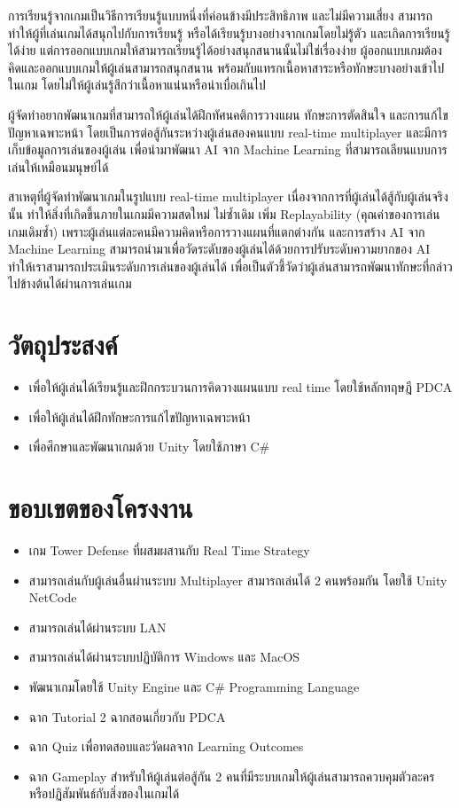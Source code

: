 \documentclass[12pt,oneside,openright,a4paper]{cpe-thai-project}
\begin{document}
การเรียนรู้จากเกมเป็นวิธีการเรียนรู้แบบหนึ่งที่ค่อนข้างมีประสิทธิภาพ และไม่มีความเสี่ยง 
สามารถทำให้ผู้ที่เล่นเกมได้สนุกไปกับการเรียนรู้ หรือได้เรียนรู้บางอย่างจากเกมโดยไม่รู้ตัว 
และเกิดการเรียนรู้ได้ง่าย แต่การออกแบบเกมให้สามารถเรียนรู้ได้อย่างสนุกสนานนั้นไม่ใช่เรื่องง่าย 
ผู้ออกแบบเกมต้องคิดและออกแบบเกมให้ผู้เล่นสามารถสนุกสนาน พร้อมกับแทรกเนื้อหาสาระหรือทักษะบางอย่างเข้าไปในเกม 
โดยไม่ให้ผู้เล่นรู้สึกว่าเนื้อหาแน่นหรือน่าเบื่อเกินไป

ผู้จัดทำอยากพัฒนาเกมที่สามารถให้ผู้เล่นได้ฝึกทัศนคติการวางแผน ทักษะการตัดสินใจ และการแก้ไขปัญหาเฉพาะหน้า 
โดยเป็นการต่อสู้กันระหว่างผู้เล่นสองคนแบบ real-time multiplayer และมีการเก็บข้อมูลการเล่นของผู้เล่น 
เพื่อนำมาพัฒนา AI จาก Machine Learning ที่สามารถเลียนแบบการเล่นให้เหมือนมนุษย์ได้

สาเหตุที่ผู้จัดทำพัฒนาเกมในรูปแบบ real-time multiplayer เนื่องจากการที่ผู้เล่นได้สู้กับผู้เล่นจริงนั้น
ทำให้สิ่งที่เกิดขึ้นภายในเกมมีความสดใหม่ ไม่ซ้ำเดิม เพิ่ม Replayability (คุณค่าของการเล่นเกมเดิมซ้ำ) 
เพราะผู้เล่นแต่ละคนมีความคิดหรือการวางแผนที่แตกต่างกัน และการสร้าง AI จาก Machine Learning 
สามารถนำมาเพื่อวัดระดับของผู้เล่นได้ด้วยการปรับระดับความยากของ AI ทำให้เราสามารถประเมินระดับการเล่นของผู้เล่นได้ 
เพื่อเป็นตัวชี้วัดว่าผู้เล่นสามารถพัฒนาทักษะที่กล่าวไปข้างต้นได้ผ่านการเล่นเกม


\section{วัตถุประสงค์}

\begin{itemize}
\item เพื่อให้ผู้เล่นได้เรียนรู้และฝึกกระบวนการคิดวางแผนแบบ real time โดยใช้หลักทฤษฎี PDCA
\item เพื่อให้ผู้เล่นได้ฝึกทักษะการแก้ไขปัญหาเฉพาะหน้า
\item เพื่อศึกษาและพัฒนาเกมด้วย Unity โดยใช้ภาษา C\#
\end{itemize}


\section{ขอบเขตของโครงงาน}

\begin{itemize}
\item  เกม Tower Defense ที่ผสมผสานกับ Real Time Strategy
\item  สามารถเล่นกับผู้เล่นอื่นผ่านระบบ Multiplayer สามารถเล่นได้ 2 คนพร้อมกัน โดยใช้ Unity NetCode
\item  สามารถเล่นได้ผ่านระบบ LAN
\item  สามารถเล่นได้ผ่านระบบปฏิบัติการ Windows และ MacOS
\item  พัฒนาเกมโดยใช้ Unity Engine และ C\# Programming Language 
\item  ฉาก Tutorial 2 ฉากสอนเกี่ยวกับ PDCA
\item  ฉาก Quiz เพื่อทดสอบและวัดผลจาก Learning Outcomes
\item  ฉาก Gameplay สำหรับให้ผู้เล่นต่อสู้กัน 2 คนที่มีระบบเกมให้ผู้เล่นสามารถควบคุมตัวละคร หรือปฏิสัมพันธ์กับสิ่งของในเกมได้
\end{itemize}
\end{document}
